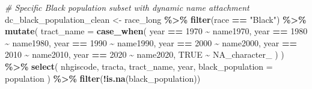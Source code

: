 \documentclass[
]{article}
\newenvironment{Shaded}{\begin{snugshade}}{\end{snugshade}}
\newcommand{\AttributeTok}[1]{\textcolor[rgb]{0.13,0.29,0.53}{#1}}
\newcommand{\CommentTok}[1]{\textcolor[rgb]{0.56,0.35,0.01}{\textit{#1}}}
\newcommand{\ConstantTok}[1]{\textcolor[rgb]{0.56,0.35,0.01}{#1}}
\newcommand{\DecValTok}[1]{\textcolor[rgb]{0.00,0.00,0.81}{#1}}
\newcommand{\FunctionTok}[1]{\textcolor[rgb]{0.13,0.29,0.53}{\textbf{#1}}}
\newcommand{\NormalTok}[1]{#1}
\newcommand{\OtherTok}[1]{\textcolor[rgb]{0.56,0.35,0.01}{#1}}
\newcommand{\SpecialCharTok}[1]{\textcolor[rgb]{0.81,0.36,0.00}{\textbf{#1}}}
\newcommand{\StringTok}[1]{\textcolor[rgb]{0.31,0.60,0.02}{#1}}
\begin{document}
\begin{Shaded}
\begin{Highlighting}[]
\CommentTok{\# Specific Black population subset with dynamic name attachment}
\NormalTok{dc\_black\_population\_clean }\OtherTok{\textless{}{-}}\NormalTok{ race\_long }\SpecialCharTok{\%\textgreater{}\%}
  \FunctionTok{filter}\NormalTok{(race }\SpecialCharTok{==} \StringTok{"Black"}\NormalTok{) }\SpecialCharTok{\%\textgreater{}\%}
  \FunctionTok{mutate}\NormalTok{(}
    \AttributeTok{tract\_name =} \FunctionTok{case\_when}\NormalTok{(}
\NormalTok{      year }\SpecialCharTok{==} \DecValTok{1970} \SpecialCharTok{\textasciitilde{}}\NormalTok{ name1970,}
\NormalTok{      year }\SpecialCharTok{==} \DecValTok{1980} \SpecialCharTok{\textasciitilde{}}\NormalTok{ name1980,}
\NormalTok{      year }\SpecialCharTok{==} \DecValTok{1990} \SpecialCharTok{\textasciitilde{}}\NormalTok{ name1990,}
\NormalTok{      year }\SpecialCharTok{==} \DecValTok{2000} \SpecialCharTok{\textasciitilde{}}\NormalTok{ name2000,}
\NormalTok{      year }\SpecialCharTok{==} \DecValTok{2010} \SpecialCharTok{\textasciitilde{}}\NormalTok{ name2010,}
\NormalTok{      year }\SpecialCharTok{==} \DecValTok{2020} \SpecialCharTok{\textasciitilde{}}\NormalTok{ name2020,}
      \ConstantTok{TRUE} \SpecialCharTok{\textasciitilde{}} \ConstantTok{NA\_character\_}
\NormalTok{    )}
\NormalTok{  ) }\SpecialCharTok{\%\textgreater{}\%}
  \FunctionTok{select}\NormalTok{(}
\NormalTok{    nhgiscode,}
\NormalTok{    tracta,}
\NormalTok{    tract\_name,}
\NormalTok{    year,}
    \AttributeTok{black\_population =}\NormalTok{ population}
\NormalTok{  ) }\SpecialCharTok{\%\textgreater{}\%}
  \FunctionTok{filter}\NormalTok{(}\SpecialCharTok{!}\FunctionTok{is.na}\NormalTok{(black\_population))}
\end{Highlighting}
\end{Shaded}
\end{document}
